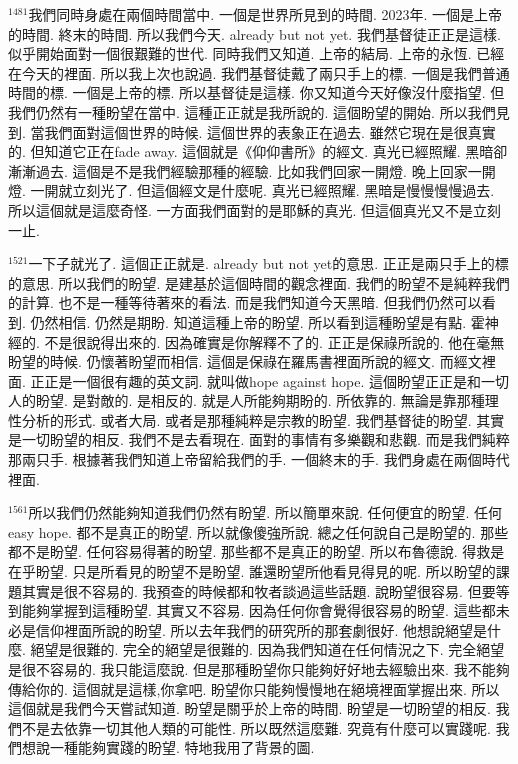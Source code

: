 \documentclass{book}
\begin{document}
$^{1481}$我們同時身處在兩個時間當中.
一個是世界所見到的時間.
2023年.
一個是上帝的時間.
終末的時間.
所以我們今天.
already but not yet.
我們基督徒正正是這樣.
似乎開始面對一個很艱難的世代.
同時我們又知道.
上帝的結局.
上帝的永恆.
已經在今天的裡面.
所以我上次也說過.
我們基督徒戴了兩只手上的標.
一個是我們普通時間的標.
一個是上帝的標.
所以基督徒是這樣.
你又知道今天好像沒什麼指望.
但我們仍然有一種盼望在當中.
這種正正就是我所說的.
這個盼望的開始.
所以我們見到.
當我們面對這個世界的時候.
這個世界的表象正在過去.
雖然它現在是很真實的.
但知道它正在fade away.
這個就是《仰仰書所》的經文.
真光已經照耀.
黑暗卻漸漸過去.
這個是不是我們經驗那種的經驗.
比如我們回家一開燈.
晚上回家一開燈.
一開就立刻光了.
但這個經文是什麼呢.
真光已經照耀.
黑暗是慢慢慢慢過去.
所以這個就是這麼奇怪.
一方面我們面對的是耶穌的真光.
但這個真光又不是立刻一止.

$^{1521}$一下子就光了.
這個正正就是.
already but not yet的意思.
正正是兩只手上的標的意思.
所以我們的盼望.
是建基於這個時間的觀念裡面.
我們的盼望不是純粹我們的計算.
也不是一種等待著來的看法.
而是我們知道今天黑暗.
但我們仍然可以看到.
仍然相信.
仍然是期盼.
知道這種上帝的盼望.
所以看到這種盼望是有點.
霍神經的.
不是很說得出來的.
因為確實是你解釋不了的.
正正是保祿所說的.
他在毫無盼望的時候.
仍懷著盼望而相信.
這個是保祿在羅馬書裡面所說的經文.
而經文裡面.
正正是一個很有趣的英文詞.
就叫做hope against hope.
這個盼望正正是和一切人的盼望.
是對敵的.
是相反的.
就是人所能夠期盼的.
所依靠的.
無論是靠那種理性分析的形式.
或者大局.
或者是那種純粹是宗教的盼望.
我們基督徒的盼望.
其實是一切盼望的相反.
我們不是去看現在.
面對的事情有多樂觀和悲觀.
而是我們純粹那兩只手.
根據著我們知道上帝留給我們的手.
一個終末的手.
我們身處在兩個時代裡面.

$^{1561}$所以我們仍然能夠知道我們仍然有盼望.
所以簡單來說.
任何便宜的盼望.
任何easy hope.
都不是真正的盼望.
所以就像傻強所說.
總之任何說自己是盼望的.
那些都不是盼望.
任何容易得著的盼望.
那些都不是真正的盼望.
所以布魯德說.
得救是在乎盼望.
只是所看見的盼望不是盼望.
誰還盼望所他看見得見的呢.
所以盼望的課題其實是很不容易的.
我預查的時候都和牧者談過這些話題.
說盼望很容易.
但要等到能夠掌握到這種盼望.
其實又不容易.
因為任何你會覺得很容易的盼望.
這些都未必是信仰裡面所說的盼望.
所以去年我們的研究所的那套劇很好.
他想說絕望是什麼.
絕望是很難的.
完全的絕望是很難的.
因為我們知道在任何情況之下.
完全絕望是很不容易的.
我只能這麼說.
但是那種盼望你只能夠好好地去經驗出來.
我不能夠傳給你的.
這個就是這樣,你拿吧.
盼望你只能夠慢慢地在絕境裡面掌握出來.
所以這個就是我們今天嘗試知道.
盼望是關乎於上帝的時間.
盼望是一切盼望的相反.
我們不是去依靠一切其他人類的可能性.
所以既然這麼難.
究竟有什麼可以實踐呢.
我們想說一種能夠實踐的盼望.
特地我用了背景的圖.
\end{document}
